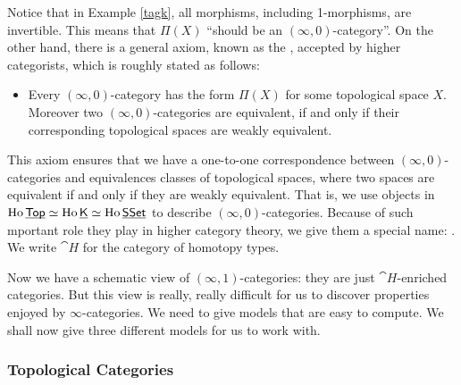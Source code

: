 Notice that in Example \ref{tagk}, all morphisms, including 1-morphisms, are invertible. This means that $\Pi(X)$ ``should be
an $(\infty,0)$-category''. On the other hand, there is a general axiom, known as the ,
accepted by higher categorists, which is roughly stated as follows:

\begin{itemize}
    \item Every $(\infty,0)$-category has the form $\Pi(X)$ for some topological space $X$. Moreover two $(\infty,0)$-categories 
    are equivalent, if and only if their corresponding topological spaces are weakly equivalent.
\end{itemize}

This axiom ensures that we have a one-to-one correspondence between $(\infty,0)$-categories and equivalences classes of topological spaces,
where two spaces are equivalent if and only if they are weakly equivalent. That is, we use objects 
in $\operatorname{Ho}\underline{\smash{\mathsf{Top}}}\simeq\operatorname{Ho}\underline{\smash{\mathsf{K}}}\simeq\operatorname{Ho}\underline{\smash{\mathsf{SSet}}}$ to describe $(\infty,0)$-categories. Because of such mportant role they play in
higher category theory, we give them a special name: . We write $\cat{H}$ for the category of homotopy types.

Now we have a schematic view of $(\infty,1)$-categories: they are just $\cat{H}$-enriched categories. But this view is really, really difficult
for us to discover properties enjoyed by $\infty$-categories. We need to give models that are easy to compute. We shall now give three 
different models for us to work with.

\subsubsection*{Topological Categories}

